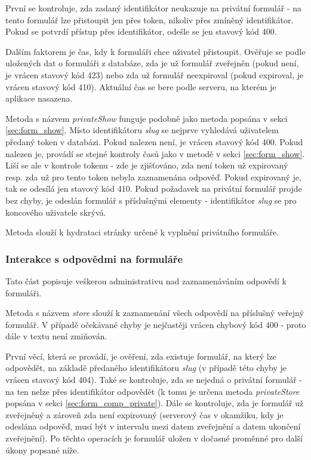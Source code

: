 			První se kontroluje, zda zadaný identifikátor neukazuje na privátní formulář - na tento formulář lze přistoupit jen přes token, nikoliv přes zmíněný identifikátor. Pokud se potvrdí přístup přes identifikátor, odešle se jen stavový kód 400.
			
			Dalším faktorem je čas, kdy k formuláři chce uživatel přistoupit. Ověřuje se podle uložených dat o formuláři z databáze, zda je už formulář zveřejněn (pokud není, je vrácen stavový kód 423) nebo zda už formulář neexpiroval (pokud expiroval, je vrácen stavový kód 410). Aktuální čas se bere podle serveru, na kterém je aplikace nasazena.
			
			Metoda s názvem \textit{privateShow} funguje podobně jako metoda popsána v sekci \ref{sec:form_show}. Místo identifikátoru \textit{slug} se nejprve vyhledává uživatelem předaný token v databázi. Pokud nalezen není, je vrácen stavový kód 400. Pokud nalezen je, provádí se stejné kontroly časů jako v metodě v sekci \ref{sec:form_show}. Liší se ale v kontrole tokenu - zde je zjišťováno, zda není token už expirovaný resp. zda už pro tento token nebyla zaznamenána odpověď. Pokud expirovaný je, tak se odesílá jen stavový kód 410. Pokud požadavek na privátní formulář projde bez chyby, je odeslán formulář s příslušnými elementy - identifikátor \textit{slug} se pro koncového uživatele skrývá.
			
			Metoda slouží k hydrataci stránky určené k vyplnění privátního formuláře.
		\subsubsection{Interakce s odpovědmi na formuláře}
		Tato část popisuje veškerou administrativu nad zaznamenáváním odpovědí k formuláři.
		
			\label{sec:form_comp_public}
			Metoda s názvem \textit{store} slouží k zaznamenání všech odpovědí na příslušný veřejný formulář. V případě očekávané chyby je nejčastěji vrácen chybový kód 400 - proto dále v textu není zmiňován.
			
			První věcí, která se provádí, je ověření, zda existuje formulář, na který lze odpovědět, na základě předaného identifikátoru \textit{slug} (v případě této chyby je vrácen stavový kód 404). Také se kontroluje, zda se nejedná o privátní formulář - na ten nelze přes identifikátor odpovědět (k tomu je určena metoda \textit{privateStore} popsána v sekci \ref{sec:form_comp_private}). Dále se kontroluje, zda je formulář už zveřejněný a zároveň zda není expirovaný (serverový čas v okamžiku, kdy je odeslána odpověď, musí být v intervalu mezi datem zveřejnění a datem ukončení zveřejnění). Po těchto operacích je formulář uložen v dočasné proměnné pro další úkony popsané níže.
			
